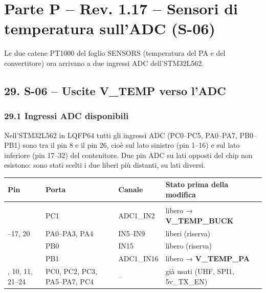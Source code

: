 \clearpage
\section[Parte P – Rev. 1.17 – Sensori di temperatura sull'ADC (S-06)]{Parte P – Rev. 1.17 – Sensori di temperatura sull'ADC (S-06)}

Le due catene PT1000 del foglio SENSORS (temperatura del PA e del convertitore) ora arrivano a due ingressi ADC dell'STM32L562.

\subsection[29. S-06 – Uscite V\_\allowbreak{}TEMP verso l'ADC]{29. S-06 – Uscite V\_\allowbreak{}TEMP verso l'ADC  }

\subsubsection[29.1 Ingressi ADC disponibili]{29.1 Ingressi ADC disponibili}

Nell'STM32L562 in LQFP64 tutti gli ingressi ADC (PC0–PC5, PA0–PA7, PB0–PB1) sono tra il pin 8 e il pin 26, cioè sul lato sinistro (pin 1–16) e sul lato inferiore (pin 17–32) del contenitore. Due pin ADC su lati opposti del chip non esistono: sono stati scelti i due liberi più distanti, su lati diversi.

{\footnotesize{}\setlength{\tabcolsep}{4pt}\renewcommand{\arraystretch}{1.1}
\begin{xltabular}{\linewidth}{>{\hsize\raggedright\arraybackslash}X>{\hsize\raggedright\arraybackslash}X>{\hsize\raggedright\arraybackslash}X>{\hsize\raggedright\arraybackslash}X}
\toprule
\textbf{Pin} & \textbf{Porta} & \textbf{Canale} & \textbf{Stato prima della modifica} \\
\midrule
\endhead
\midrule[0.15pt]\\\bottomrule\endfoot
\bottomrule{} & PC1 & ADC1\_\allowbreak{}IN2 & libero → \textbf{V\_\allowbreak{}TEMP\_\allowbreak{}BUCK} \\–17, 20 & PA0–PA3, PA4 & IN5–IN9 & liberi (riserva) \\ & PB0 & IN15 & libero (riserva) \\ & PB1 & ADC1\_\allowbreak{}IN16 & libero → \textbf{V\_\allowbreak{}TEMP\_\allowbreak{}PA} \\, 10, 11, 21–24 & PC0, PC2, PC3, PA5–PA7, PC4 & – & già usati (UHF, SPI1, 5v\_\allowbreak{}TX\_\allowbreak{}EN) \\
\end{xltabular}}

